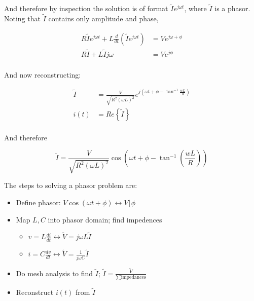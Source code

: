 \documentclass[10pt]{article}
\begin{document}
And therefore by inspection the solution is of format $ \tilde{I} e^{j\omega t} $, where $ \tilde{I} $ is a phasor. Noting that $ \tilde{I} $  contains only amplitude and phase,

\begin{equation}
	\begin{split}
	R \tilde{I} e ^{j \omega t} + L \frac{d}{dt}(\tilde{I} e^{j \omega t}) &= Ve^{j \omega + \phi} \\
		R \tilde{I} + L \tilde{I} j \omega  &= Ve^{j \phi} \\
\end{split}
\end{equation}

And now reconstructing:

\begin{equation}
	\begin{split}
		\tilde{I} &= \frac{V}{\sqrt{R^2 (\omega L)^2}} e^{j(\omega t + \phi - \tan^{-1}{\frac{wL}{R}})} \\
		 i(t) &= Re \left\{ \tilde{I} \right\}   \\
	\end{split}
\end{equation}

And therefore

\begin{equation}
	\tilde{I} = \frac{V}{\sqrt{R^2 (\omega L)^2}} \cos{(\omega t + \phi - \tan^{-1}(\frac{wL}{R}))}
\end{equation}


The steps to solving a phasor problem are:
\begin{itemize}
	\item Define phasor: $ V \cos{(\omega t + \phi)} \leftrightarrow V\lfloor\phi $ 
	\item Map $ L, C $ into phasor domain; find impedences
		\begin{itemize}
			\item $ v = L \frac{di}{dt} \leftrightarrow \tilde{V} = j \omega L \tilde{I} $ 
			\item $ i = C \frac{dv}{dt} \leftrightarrow \tilde{V} = \frac{1}{j \omega C }\tilde{I} $ 
		\end{itemize}
	\item Do mesh analysis to find $ \tilde{I} $; $ \tilde{I} = \frac{\tilde{V}}{\sum \text{impedances} } $ 
	\item Reconstruct $ i(t) $ from $ \tilde{I} $ 
\end{itemize}
\end{document}
